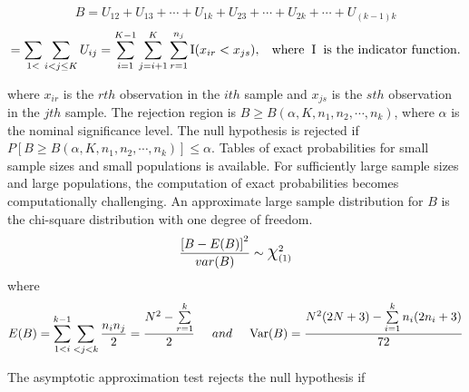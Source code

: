 \documentclass[12pt,oneside]{report}
\theoremstyle{definition}
\theoremstyle{mystyle}
\begin{document}
\begin{equation*}
B=U_{12}+U_{13}+\cdots+U_{1k}+U_{23}+\cdots+U_{2k}+\cdots+U_{(k-1)k}
\end{equation*}
\begin{equation*}
=\sum\limits_{1<}\sum\limits_{i<j\leq K}U_{ij}=\sum\limits_{i=1}^{K-1}\sum\limits_{j=i+1}^{K}\sum\limits_{r=1}^{n_{j}}\mathrm{I}(x_{ir}<x_{js}),\hspace{3mm}\text{where}\hspace{2mm} \mathrm{I}\hspace{2mm} \text{is the indicator function.}
\end{equation*}

\vspace{5mm}
where $x_{ir}$ is the $rth$  observation in the $ith$ sample and $x_{js}$ is the $sth$  observation in the $jth$ sample. The rejection region is $B\geq B(\alpha,K,n_{1},n_{2},\cdots,n_{k})$, where $\alpha$ is the nominal significance level. The null hypothesis is rejected if $P[B\geq B(\alpha,K,n_{1},n_{2},\cdots,n_{k})] \leq \alpha $. Tables of exact probabilities for small sample sizes and small populations is available. For   sufficiently large sample sizes  and large    populations, the computation of exact probabilities becomes computationally challenging. An approximate  large sample  distribution for $B$ is the  chi-square distribution with one degree of freedom.\\
\begin{equation}
\frac{\left[B-E(B)\right]^{2}}{var(B)}\sim \mbox{\Large$\chi$}^{2}_{(1)}
\end{equation}
where 
\begin{equation*}
E(B)=\sum\limits_{1<i}^{k-1}\sum\limits_{<j<k}\frac{n_{i}n_{j}}{2}=\displaystyle\frac{N^{2}-\sum\limits_{r=1}^{k}}{2} \hspace{5mm} and \hspace{5mm} \text{Var}(B)=\frac{N^{2}(2N+3)-\sum\limits_{i=1}^{k}n_{i}(2n_{i}+3)}{72}
\end{equation*}


The asymptotic approximation test rejects the null hypothesis if
\end{document}
